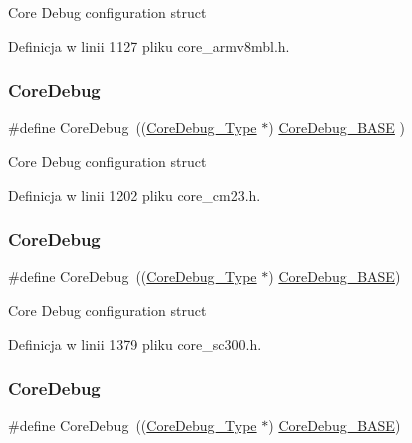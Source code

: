 Core Debug configuration struct 

Definicja w linii 1127 pliku core\+\_\+armv8mbl.\+h.

\mbox{\label{group___c_m_s_i_s__core__base_gab6e30a2b802d9021619dbb0be7f5d63d}} 
\subsubsection{\texorpdfstring{Core\+Debug}{CoreDebug}\hspace{0.1cm}{\footnotesize\ttfamily [2/8]}}
{\footnotesize\ttfamily \#define Core\+Debug~((\hyperlink{struct_core_debug___type}{Core\+Debug\+\_\+\+Type} $\ast$)     \hyperlink{group___c_m_s_i_s__core__base_ga680604dbcda9e9b31a1639fcffe5230b}{Core\+Debug\+\_\+\+B\+A\+SE}   )}

Core Debug configuration struct 

Definicja w linii 1202 pliku core\+\_\+cm23.\+h.

\mbox{\label{group___c_m_s_i_s__core__base_gab6e30a2b802d9021619dbb0be7f5d63d}} 
\subsubsection{\texorpdfstring{Core\+Debug}{CoreDebug}\hspace{0.1cm}{\footnotesize\ttfamily [3/8]}}
{\footnotesize\ttfamily \#define Core\+Debug~((\hyperlink{struct_core_debug___type}{Core\+Debug\+\_\+\+Type} $\ast$)     \hyperlink{group___c_m_s_i_s__core__base_ga680604dbcda9e9b31a1639fcffe5230b}{Core\+Debug\+\_\+\+B\+A\+SE})}

Core Debug configuration struct 

Definicja w linii 1379 pliku core\+\_\+sc300.\+h.

\mbox{\label{group___c_m_s_i_s__core__base_gab6e30a2b802d9021619dbb0be7f5d63d}} 
\subsubsection{\texorpdfstring{Core\+Debug}{CoreDebug}\hspace{0.1cm}{\footnotesize\ttfamily [4/8]}}
{\footnotesize\ttfamily \#define Core\+Debug~((\hyperlink{struct_core_debug___type}{Core\+Debug\+\_\+\+Type} $\ast$)     \hyperlink{group___c_m_s_i_s__core__base_ga680604dbcda9e9b31a1639fcffe5230b}{Core\+Debug\+\_\+\+B\+A\+SE})}

